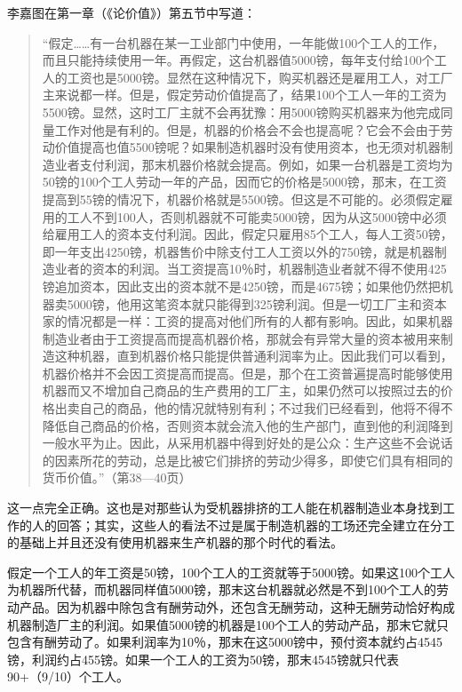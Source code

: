 


李嘉图在第一章（《论价值》）第五节中写道：

\begin{quote}{“假定……有一台机器在某一工业部门中使用，一年能做100个工人的工作，而且只能持续使用一年。再假定，这台机器值5000镑，每年支付给100个工人的工资也是5000镑。显然在这种情况下，购买机器还是雇用工人，对工厂主来说都一样。但是，假定劳动价值提高了，结果100个工人一年的工资为5500镑。显然，这时工厂主就不会再犹豫：用5000镑购买机器来为他完成同量工作对他是有利的。但是，机器的价格会不会也提高呢？它会不会由于劳动价值提高也值5500镑呢？如果制造机器时没有使用资本，也无须对机器制造业者支付利润，那末机器价格就会提高。例如，如果一台机器是工资均为50镑的100个工人劳动一年的产品，因而它的价格是5000镑，那末，在工资提高到55镑的情况下，机器价格就是5500镑。但这是不可能的。必须假定雇用的工人不到100人，否则机器就不可能卖5000镑，因为从这5000镑中必须给雇用工人的资本支付利润。因此，假定只雇用85个工人，每人工资50镑，即一年支出4250镑，机器售价中除支付工人工资以外的750镑，就是机器制造业者的资本的利润。当工资提高10％时，机器制造业者就不得不使用425镑追加资本，因此支出的资本就不是4250镑，而是4675镑；如果他仍然把机器卖5000镑，他用这笔资本就只能得到325镑利润。但是一切工厂主和资本家的情况都是一样：工资的提高对他们所有的人都有影响。因此，如果机器制造业者由于工资提高而提高机器价格，那就会有异常大量的资本被用来制造这种机器，直到机器价格只能提供普通利润率为止。因此我们可以看到，机器价格并不会因工资提高而提高。但是，那个在工资普遍提高时能够使用机器而又不增加自己商品的生产费用的工厂主，如果仍然可以按照过去的价格出卖自己的商品，他的情况就特别有利；不过我们已经看到，他将不得不降低自己商品的价格，否则资本就会流入他的生产部门，直到他的利润降到一般水平为止。因此，从采用机器中得到好处的是公众：生产这些不会说话的因素所花的劳动，总是比被它们排挤的劳动少得多，即使它们具有相同的货币价值。”（第38—40页）}\end{quote}

这一点完全正确。这也是对那些认为受机器排挤的工人能在机器制造业本身找到工作的人的回答；其实，这些人的看法不过是属于制造机器的工场还完全建立在分工的基础上并且还没有使用机器来生产机器的那个时代的看法。

假定一个工人的年工资是50镑，100个工人的工资就等于5000镑。如果这100个工人为机器所代替，而机器同样值5000镑，那末这台机器就必然是不到100个工人的劳动产品。因为机器中除包含有酬劳动外，还包含无酬劳动，这种无酬劳动恰好构成机器制造厂主的利润。如果值5000镑的机器是100个工人的劳动产品，那末它就只包含有酬劳动了。如果利润率为10％，那末在这5000镑中，预付资本就约占4545镑，利润约占455镑。如果一个工人的工资为50镑，那末4545镑就只代表90+（9/10）个工人。

